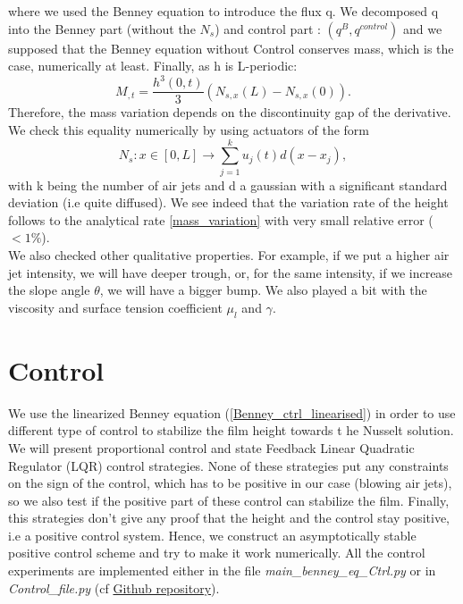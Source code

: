 \documentclass[12pt]{article}
\begin{document}
where we used the Benney equation to introduce the flux q. We decomposed q into the Benney part (without the $N_s$) and control part : $(q^B, q^{control})$ and we supposed that the Benney equation without Control conserves mass, which is the case, numerically at least.
Finally, as h is L-periodic: 
\begin{equation}\label{mass_variation}
M_{,t} = \frac{h^3(0,t)}{3}(N_{s,x}(L)-N_{s,x}(0)).
\end{equation}
Therefore, the mass variation depends on the discontinuity gap of the derivative. 
We check this equality numerically by using actuators of the form 
$$N_s: x\in [0,L] \rightarrow \sum_{j=1}^{k}u_j(t)d(x-x_j),$$ with k being the number of air 
jets and d a gaussian with a significant standard deviation (i.e quite diffused). We
 see indeed that the variation rate of the height follows to the analytical rate \eqref{mass_variation} with very small relative error
  ($<1\%$).  
\\

We also checked other qualitative properties. For example, if we put a higher air jet intensity, we will have deeper trough, or, for the same intensity, if we increase the slope angle $\theta$, we will have a bigger bump. We also played a bit with the viscosity and surface tension coefficient $\mu_l$ and $\gamma$.





\newpage
\section{Control}\label{Section_Control}
We use the linearized Benney equation (\ref{Benney_ctrl_linearised}) in order to use different type of control to stabilize the film height towards t
he Nusselt solution. We will present proportional control and state Feedback Linear Quadratic Regulator (LQR) control strategies. None of these strategies 
put any constraints on the sign of the control, which has to be positive in our case (blowing air jets), so we also test if the positive part of 
these control can stabilize the film. Finally, this strategies don't give any proof that the height and the control stay positive, i.e a positive
control system. Hence, we construct an asymptotically stable positive control scheme and try to make it work numerically. All the control experiments
are implemented either in the file \textit{main\_benney\_eq\_Ctrl.py} or in \textit{Control\_file.py} (cf \href{https://github.com/Bilal59170/Repo_Warwick_internship}{Github repository}).
\end{document}
